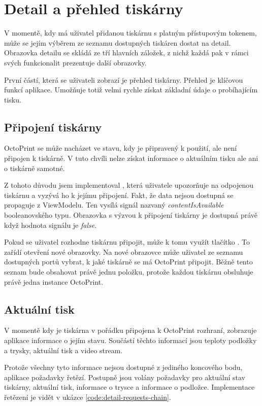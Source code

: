 \section{Detail a přehled tiskárny}

V momentě, kdy má uživatel přidanou tiskárnu s platným přístupovým tokenem, může se jejím výběrem ze seznamu dostupných tiskáren dostat na detail.
Obrazovka detailu se skládá ze tří hlavních záložek, z nichž každá pak v rámci svých funkcionalit prezentuje další obrazovky.

První částí, která se uživateli zobrazí je přehled tiskárny.
Přehled je klíčovou funkcí aplikace.
Umožňuje totiž velmi rychle získat základní údaje o probíhajícím tisku.

\subsection{Připojení tiskárny}

OctoPrint se může nacházet ve stavu, kdy je připravený k použití, ale není připojen k tiskárně.
V tuto chvíli nelze získat informace o aktuálním tisku ale ani o tiskárně samotné.

Z tohoto důvodu jsem implementoval , která uživatele upozorňuje na odpojenou tiskárnu a vyzývá ho k jejímu připojení.
Fakt, že data nejsou dostupná se propaguje z ViewModelu.
Ten vysílá signál nazvaný \textit{contentIsAvailable} booleanovského typu.
Obrazovka s výzvou k připojení tiskárny je dostupná právě když hodnota signálu je \textit{false}.

Pokud se uživatel rozhodne tiskárnu připojit, může k tomu využít tlačítko .
To zařídí otevření nové obrazovky.
Na nové obrazovce může uživatel ze seznamu dostupných portů vybrat, k jaké tiskárně se má OctoPrint připojit.
Běžně tento seznam bude obsahovat právě jednu položku, protože každou tiskárnu obsluhuje právě jedna instance OctoPrint.

\subsection{Aktuální tisk}

V momentě kdy je tiskárna v pořádku připojena k OctoPrint rozhraní, zobrazuje aplikace informace o jejím stavu.
Součástí těchto informací jsou teploty podložky a trysky, aktuální tisk a video stream.

Protože všechny tyto informace nejsou dostupné z jediného koncového bodu, aplikace požadavky řetězí.
Postupně jsou volány požadavky pro aktuální stav tiskárny, aktuální tisk, informace o trysce a informace o podložce.
Implementace řetězení je vidět v ukázce \ref{code:detail-requests-chain}.

